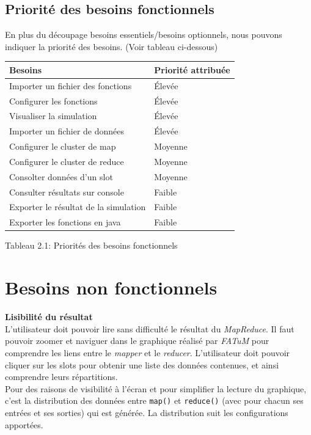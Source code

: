 \subsection{Priorité des besoins fonctionnels}
En plus du découpage besoins essentiels/besoins optionnels, nous pouvons indiquer la priorité des besoins. (Voir tableau ci-dessous)
\begin{center}
\begin{tabularx}{\textwidth}{|X|X|}
  \hline {\bf Besoins} & {\bf Priorité attribuée} \\[4ex]

  \hline Importer un fichier des fonctions & Élevée\\[2ex]
  \hline Configurer les fonctions & Élevée\\[2ex]
  \hline Visualiser la simulation & Élevée\\[2ex]
  \hline Importer un fichier de données & Élevée\\[2ex]
  \hline Configurer le cluster de map & Moyenne\\[2ex]
  \hline Configurer le cluster de reduce & Moyenne\\[2ex]
  \hline Consolter données d'un slot & Moyenne\\[2ex]
  \hline Consulter résultats sur console & Faible\\[2ex]
  \hline Exporter le résultat de la simulation & Faible\\[2ex]
  \hline Exporter les fonctions en java & Faible\\[2ex]
  \hline
\end{tabularx}
\bigskip
Tableau 2.1: Priorités des besoins fonctionnels
\end{center}
\section{Besoins non fonctionnels}

\textbf{Lisibilité du résultat\\} L'utilisateur doit pouvoir lire sans difficulté le résultat du \textit{MapReduce}. Il faut pouvoir zoomer et naviguer dans le graphique réalisé par \textit{FATuM} pour comprendre les liens entre le \textit{mapper} et le \textit{reducer}. L'utilisateur doit pouvoir cliquer sur les slots pour obtenir une liste des données contenues, et ainsi comprendre leurs répartitions.\\

Pour des raisons de visibilité à l'écran et pour simplifier la lecture du graphique, c'est la distribution des données entre {\tt map()} et {\tt reduce()} (avec pour chacun ses entrées et ses sorties) qui est générée. La distribution suit les configurations apportées.


